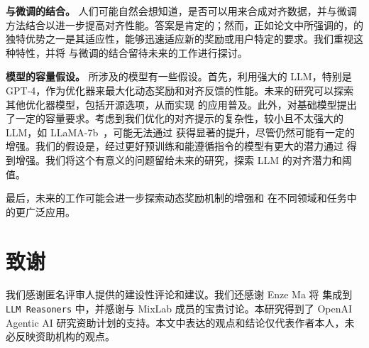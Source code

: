 \noindent \textbf{与微调的结合。}  
人们可能自然会想知道，\ours 是否可以用来合成对齐数据，并与微调方法结合以进一步提高对齐性能。答案是肯定的；然而，正如论文中所强调的，\ours 的独特优势之一是其适应性，能够迅速适应新的奖励或用户特定的要求。我们重视这种特性，并将 \ours 与微调的结合留待未来的工作进行探讨。

\noindent \textbf{模型的容量假设。}  
\ours 所涉及的模型有一些假设。首先，\ours 利用强大的 LLM，特别是 GPT-4，作为优化器来最大化动态奖励和对齐反馈的性能。未来的研究可以探索其他优化器模型，包括开源选项，从而实现 \ours 的应用普及。此外，\ours 对基础模型提出了一定的容量要求。考虑到我们优化的对齐提示的复杂性，较小且不太强大的 LLM，如 LLaMA-7b~\cite{touvron2023llama}，可能无法通过 \ours 获得显著的提升，尽管仍然可能有一定的增强。我们的假设是，经过更好预训练和能遵循指令的模型有更大的潜力通过 \ours 得到增强。我们将这个有意义的问题留给未来的研究，探索 LLM 的对齐潜力和阈值。

最后，未来的工作可能会进一步探索动态奖励机制的增强和 \ours 在不同领域和任务中的更广泛应用。
\section*{致谢}

我们感谢匿名评审人提供的建设性评论和建议。我们还感谢 Enze Ma 将 \ours 集成到 \texttt{LLM Reasoners} 中，并感谢与 MixLab 成员的宝贵讨论。本研究得到了 OpenAI Agentic AI 研究资助计划的支持。本文中表达的观点和结论仅代表作者本人，未必反映资助机构的观点。
